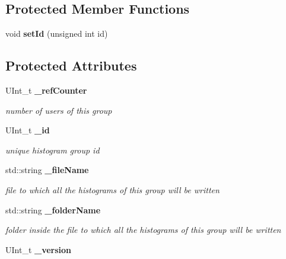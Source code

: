 \subsection*{Protected Member Functions}
\begin{DoxyCompactItemize}
\item 
void {\bfseries set\-Id} (unsigned int id)\label{classhistmgr_1_1HistMgr_1_1HistogramGroupData__t_a4b84f56cb6cff0f0d3fbcdd5213be5db}

\end{DoxyCompactItemize}
\subsection*{Protected Attributes}
\begin{DoxyCompactItemize}
\item 
U\-Int\-\_\-t {\bf \-\_\-ref\-Counter}\label{classhistmgr_1_1HistMgr_1_1HistogramGroupData__t_a9e13ffec297c7682e7846f3fc96a4904}

\begin{DoxyCompactList}\small\item\em number of users of this group \end{DoxyCompactList}\item 
U\-Int\-\_\-t {\bf \-\_\-id}\label{classhistmgr_1_1HistMgr_1_1HistogramGroupData__t_a2aa126884bac9c85f0063466bcc44d47}

\begin{DoxyCompactList}\small\item\em unique histogram group id \end{DoxyCompactList}\item 
std\-::string {\bf \-\_\-file\-Name}\label{classhistmgr_1_1HistMgr_1_1HistogramGroupData__t_a887041e492c5179f576e2ff0348286e0}

\begin{DoxyCompactList}\small\item\em file to which all the histograms of this group will be written \end{DoxyCompactList}\item 
std\-::string {\bf \-\_\-folder\-Name}\label{classhistmgr_1_1HistMgr_1_1HistogramGroupData__t_a1a2b8f1b779a7d2f62da302d4d77b620}

\begin{DoxyCompactList}\small\item\em folder inside the file to which all the histograms of this group will be written \end{DoxyCompactList}\item 
U\-Int\-\_\-t {\bfseries \-\_\-version}\label{classhistmgr_1_1HistMgr_1_1HistogramGroupData__t_a14fe90666c845803d60b98ac8d15db85}

\end{DoxyCompactItemize}
